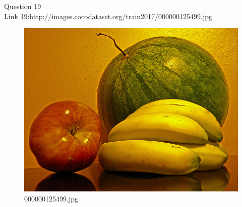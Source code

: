 Question 19\\
Link 19:http://images.cocodataset.org/train2017/000000125499.jpg
    \begin{figure}[h]
        \centering
        \includegraphics[width=0.8\linewidth]{../image set/easy/000000125499.jpg}
        \caption{000000125499.jpg}
    \end{figure}
